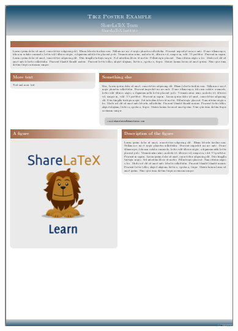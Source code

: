 \documentclass[25pt, a0paper, portrait]{tikzposter}
\begin{document}
\begin{columns}
{\begin{tikzfigure}
	    \includegraphics[width=\linewidth]{Tikzposter_theme/Desert}
	\end{tikzfigure}
    }
\end{columns}
\end{document}
